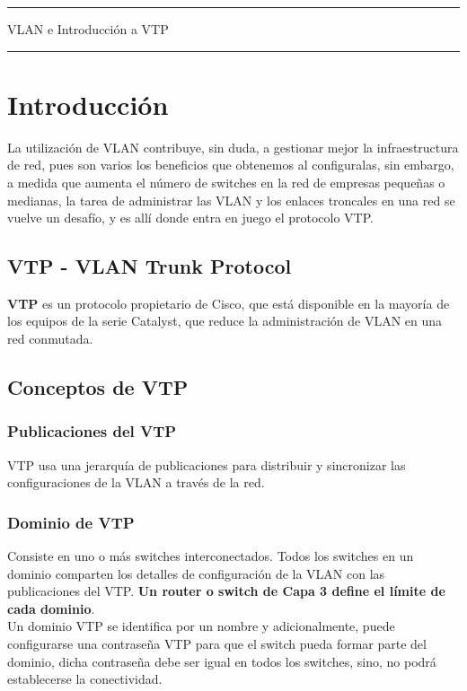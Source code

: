 \documentclass[12pt]{article}
\begin{document}
\begin{center}


\noindent\rule{\textwidth}{1pt}
\huge{VLAN e Introducción a VTP}
\noindent\rule{\textwidth}{1pt}
\end{center}
 
\section{Introducción}   
La utilización de VLAN contribuye, sin duda, a gestionar mejor la infraestructura de red, pues son varios los beneficios que obtenemos al configuralas, sin embargo, a medida que aumenta el número de switches en la red de empresas pequeñas o medianas, la tarea de administrar las VLAN y los enlaces troncales en una red se vuelve un desafío, y es allí donde entra en juego el protocolo VTP.

\subsection{VTP - VLAN Trunk Protocol}

\textbf{VTP} es un protocolo propietario de Cisco, que está disponible en la mayoría de los equipos de la serie Catalyst, que reduce la administración de VLAN en una red conmutada.

 \subsection{Conceptos de VTP}
  \subsubsection{Publicaciones del VTP}
VTP usa una jerarquía de publicaciones para distribuir y sincronizar las configuraciones de la VLAN a través de la red.

 \subsubsection{Dominio de VTP}
Consiste en uno o más switches interconectados. Todos los switches en un dominio comparten los detalles de configuración de la VLAN con las publicaciones del VTP. \textbf{Un router o switch de Capa 3 define el límite de cada dominio}.\\
Un dominio VTP se identifica por un nombre y adicionalmente, puede configurarse una contraseña VTP para que el switch pueda formar parte del dominio, dicha contraseña debe ser igual en todos los switches, sino, no podrá establecerse la conectividad.
\end{document}
